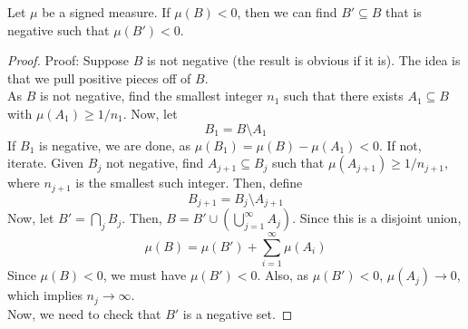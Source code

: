 \begin{lemma}
    Let $\mu$ be a signed measure. If $\mu(B) < 0$, then we can find $B' \subseteq B$ that is negative such that $\mu(B') < 0$. 
\end{lemma}
\begin{proof}{Proof:}
    Suppose $B$ is not negative (the result is obvious if it is). The idea is that we pull positive pieces off of $B$.\\

    As $B$ is not negative, find the smallest integer $n_1$ such that there exists $A_1 \subseteq B$ with $\mu(A_1) \geq 1/n_1$. Now, let
    \[ B_1 = B \setminus A_1 \]
    If $B_1$ is negative, we are done, as $\mu(B_1) = \mu(B) - \mu(A_1) < 0$. If not, iterate. Given $B_j$ not negative, find $A_{j + 1} \subseteq B_j$ such that $\mu(A_{j + 1}) \geq 1/n_{j + 1}$, where $n_{j + 1}$ is the smallest such integer. Then, define %
    \[ B_{j + 1} = B_j \setminus A_{j + 1} \]
    Now, let $B' = \bigcap_{j} B_j$. Then, $B = B' \cup \left(\bigcup_{j = 1}^{\infty} A_j\right)$. Since this is a disjoint union,
    \[ \mu(B) = \mu(B') + \sum_{i = 1}^{\infty} \mu(A_i) \]
    Since $\mu(B) < 0$, we must have $\mu(B') < 0$. Also, as $\mu(B') < 0$, $\mu(A_j) \to 0$, which implies $n_j \to \infty$.\\

    Now, we need to check that $B'$ is a negative set.
\end{proof}
